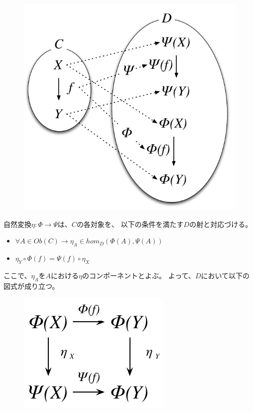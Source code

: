 \documentclass{jsarticle}
\begin{document}
\begin{figure}[htbp]
    \centering
    \includegraphics{diag_nt.pdf} 
\end{figure}

自然変換$\eta:\Phi\to\Psi$は、$C$の各対象を、
以下の条件を満たす$D$の射と対応づける。
\begin{itemize}
    \item $\forall A\in Ob(C)\to \eta_A\in hom_D(\Phi(A),\Psi(A))$
    \item $\eta_Y\circ \Phi(f)=\Psi(f)\circ\eta_X$
\end{itemize}
ここで、$\eta_A$を$A$における$\eta$のコンポーネントとよぶ。
よって、$D$において以下の図式が成り立つ。

\begin{figure}[htbp]
    \centering
    \includegraphics{diag_nt2.pdf} 
\end{figure}
\end{document}
